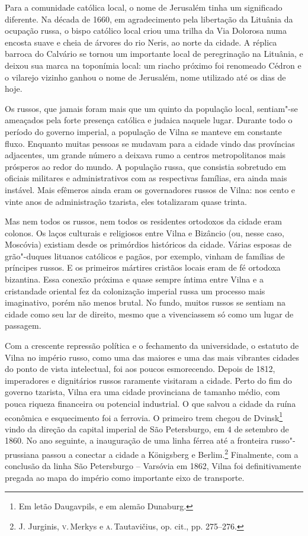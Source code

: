 Para a comunidade católica local, o nome de Jerusalém tinha um
significado diferente. Na década de 1660, em agradecimento pela
libertação da Lituânia da ocupação russa, o bispo católico local criou
uma trilha da Via Dolorosa numa encosta suave e cheia de árvores do rio
Neris, ao norte da cidade. A réplica barroca do Calvário se tornou um
importante local de peregrinação na Lituânia, e deixou sua marca na
toponímia local: um riacho próximo foi renomeado Cédron e o vilarejo
vizinho ganhou o nome de Jerusalém, nome utilizado até os dias de hoje.

Os russos, que jamais foram mais que um quinto da população local,
sentiam"-se ameaçados pela forte presença católica e judaica naquele
lugar. Durante todo o período do governo imperial, a população de Vilna
se manteve em constante fluxo. Enquanto muitas pessoas se mudavam para a
cidade vindo das províncias adjacentes, um grande número a deixava rumo
a centros metropolitanos mais prósperos ao redor do mundo. A população
russa, que consistia sobretudo em oficiais militares e administrativos
com as respectivas famílias, era ainda mais instável. Mais efêmeros
ainda eram os governadores russos de Vilna: nos cento e vinte anos de
administração tzarista, eles totalizaram quase trinta.

Mas nem todos os russos, nem todos os residentes ortodoxos da cidade
eram colonos. Os laços culturais e religiosos entre Vilna e Bizâncio
(ou, nesse caso, Moscóvia) existiam desde os primórdios históricos da
cidade. Várias esposas de grão"-duques lituanos católicos e pagãos, por
exemplo, vinham de famílias de príncipes russos. E os primeiros mártires
cristãos locais eram de fé ortodoxa bizantina. Essa conexão próxima e
quase sempre íntima entre Vilna e a cristandade oriental fez da
colonização imperial russa um processo mais imaginativo, porém não menos
brutal. No fundo, muitos russos se sentiam na cidade como seu lar de
direito, mesmo que a vivenciassem só como um lugar de passagem.

Com a crescente repressão política e o fechamento da universidade, o
estatuto de Vilna no império russo, como uma das maiores e uma das mais
vibrantes cidades do ponto de vista intelectual, foi aos poucos
esmorecendo. Depois de 1812, imperadores e dignitários russos raramente
visitaram a cidade. Perto do fim do governo tzarista, Vilna era uma
cidade provinciana de tamanho médio, com pouca riqueza financeira ou
potencial industrial. O que salvou a cidade da ruína econômica e
esquecimento foi a ferrovia. O primeiro trem chegou de Dvinsk\footnote{Em letão Daugavpils, e em alemão Dunaburg.} vindo da direção da capital
imperial de São Petersburgo, em 4 de setembro de 1860. No ano seguinte, a
inauguração de uma linha férrea até a fronteira russo"-prussiana passou a
conectar a cidade a Königsberg e Berlim.\footnote{J. Jurginis, \textsc{v}.\,Merkys e \textsc{a}.\,Tautavičius, op. cit., pp. 275--276.} Finalmente, com a conclusão da linha São Petersburgo -- Varsóvia em 1862, Vilna foi
definitivamente pregada ao mapa do império como importante eixo de
transporte.

